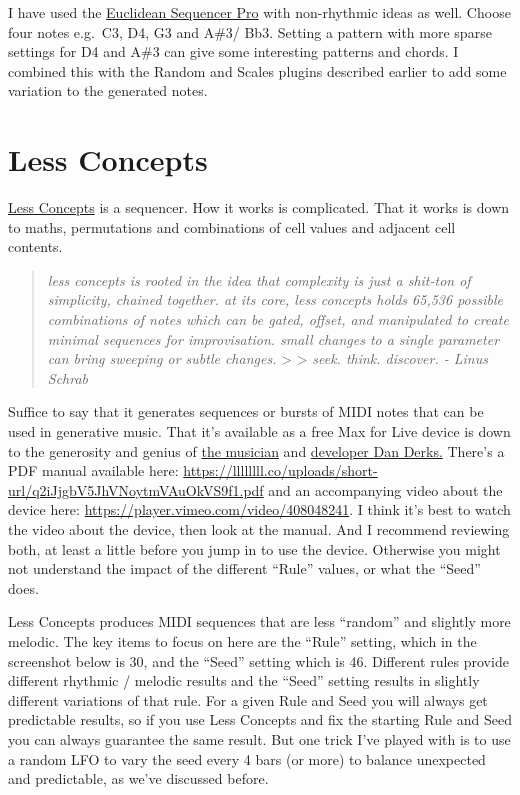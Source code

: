 \documentclass[
  12pt,
  letterpaper,
  oneside,
  open=any]{scrbook}
\makeatletter
\newcommand*\pandocbounded[1]{%
  \sbox\pandoc@box{#1}%
  \Gscale@div\@tempa{\textheight}{\dimexpr\ht\pandoc@box+\dp\pandoc@box\relax}%
  \Gscale@div\@tempb{\linewidth}{\wd\pandoc@box}%
  \ifdim\@tempb\p@<\@tempa\p@\let\@tempa\@tempb\fi%
  \ifdim\@tempa\p@<\p@\scalebox{\@tempa}{\usebox\pandoc@box}%
  \else\usebox{\pandoc@box}%
  \fi%
}
\makeatother
\begin{document}
I have used the
\href{https://www.youtube.com/watch?v=orh9TtREa0w}{Euclidean Sequencer
Pro} with non-rhythmic ideas as well. Choose four notes e.g.~C3, D4, G3
and A\#3/ Bb3. Setting a pattern with more sparse settings for D4 and
A\#3 can give some interesting patterns and chords. I combined this with
the Random and Scales plugins described earlier to add some variation to
the generated notes.

\pandocbounded{\texttt{[image: images/Euclidean\_sequencer\_pro.png]}}

\section{Less Concepts}\label{less-concepts}

\href{https://maxforlive.com/library/device/6167/less-concepts}{Less
Concepts} is a sequencer. How it works is complicated. That it works is
down to maths, permutations and combinations of cell values and adjacent
cell contents.

\begin{quote}
\emph{less concepts is rooted in the idea that complexity is just a
shit-ton of simplicity, chained together. at its core, less concepts
holds 65,536 possible combinations of notes which can be gated, offset,
and manipulated to create minimal sequences for improvisation. small
changes to a single parameter can bring sweeping or subtle changes.}
\textgreater{} \textgreater{} \emph{seek. think. discover. - Linus
Schrab}
\end{quote}

Suffice to say that it generates sequences or bursts of MIDI notes that
can be used in generative music. That it's available as a free Max for
Live device is down to the generosity and genius of
\href{https://dndrks.bandcamp.com}{the musician} and
\href{https://github.com/dndrks}{developer Dan Derks.} There's a PDF
manual available here:
\url{https://llllllll.co/uploads/short-url/q2iJjgbV5JhVNoytmVAuOkVS9f1.pdf}
and an accompanying video about the device here:
\url{https://player.vimeo.com/video/408048241}. I think it's best to
watch the video about the device, then look at the manual. And I
recommend reviewing both, at least a little before you jump in to use
the device. Otherwise you might not understand the impact of the
different ``Rule'' values, or what the ``Seed'' does.

Less Concepts produces MIDI sequences that are less ``random'' and
slightly more melodic. The key items to focus on here are the ``Rule''
setting, which in the screenshot below is 30, and the ``Seed'' setting
which is 46. Different rules provide different rhythmic / melodic
results and the ``Seed'' setting results in slightly different
variations of that rule. For a given Rule and Seed you will always get
predictable results, so if you use Less Concepts and fix the starting
Rule and Seed you can always guarantee the same result. But one trick
I've played with is to use a random LFO to vary the seed every 4 bars
(or more) to balance unexpected and predictable, as we've discussed
before.
\end{document}
